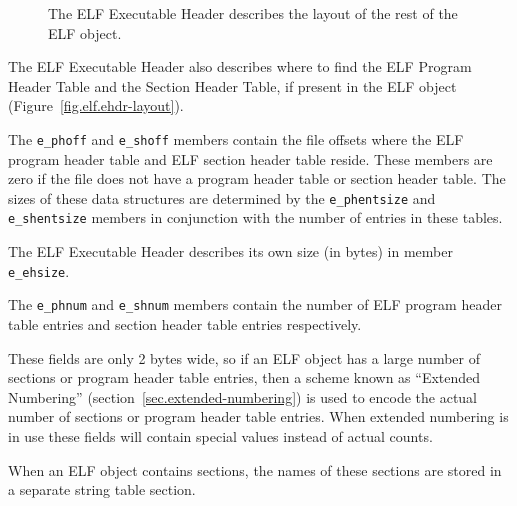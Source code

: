 \documentclass[a4paper,pdftex]{book}
\makeatletter
\newcommand{\parameter}[1]{\texttt{#1}}
\newcommand{\elfdatastructure}[1]{\textsf{#1}}
\newenvironment{callout}[2][black]{%
  \begingroup\newcommand{\@cocolor}{#1}%
  \setlength{\shadowsize}{1.2pt}%
  \newcommand{\@cogroup}[1]{#2}}{\endgroup}
\newcommand{\@co}[1]{\shadowbox{\color{\@cocolor}#1}}
\newcommand{\coref}[1]{%
  \hypertarget{\@cogroup.#1.cr}{%
    \hyperlink{\@cogroup.#1.co}{\@co{#1}}}}
\makeatother
\begin{document}
\begin{callout}{ehdr}
\begin{description}
\begin{figure}
    \caption{The ELF \elfdatastructure{Executable Header} describes
      the layout of the rest of the ELF object.}
    \label{fig.elf.ehdr-layout}
  \end{figure}

  \item[\coref{4} \coref{5}] The ELF \elfdatastructure{Executable
    Header} also describes where to find the ELF
    \elfdatastructure{Program Header Table} and the
    \elfdatastructure{Section Header Table}, if present in the ELF
    object (Figure~\vref{fig.elf.ehdr-layout}).

    The \parameter{e\_phoff} and \parameter{e\_shoff} members contain
    the file offsets where the ELF program header table and ELF
    section header table reside.  These members are zero if the file
    does not have a program header table or section header table.  The
    sizes of these data structures are determined by the
    \parameter{e\_phentsize} and \parameter{e\_shentsize} members in
    conjunction with the number of entries in these tables.%

    The ELF \elfdatastructure{Executable Header} describes its own
    size (in bytes) in member
    \parameter{e\_ehsize}.

  \item[\coref{6} \coref{7}] The \parameter{e\_phnum} and
    \parameter{e\_shnum} members contain the number of ELF program
    header table entries and section header table entries
    respectively.

    These fields are only 2 bytes wide, so if an ELF object has a
    large number of sections or program header table entries, then a
    scheme known as ``Extended Numbering''
    (section~\vref{sec.extended-numbering}) is used to encode the
    actual number of sections or program header table entries.  When
    extended numbering is in use these fields will contain special
    values instead of actual counts.

  \item[\coref{8}] When an ELF object contains sections, the names of
    these sections are stored in a separate string table section.


\end{description}
\end{callout}
\end{document}
